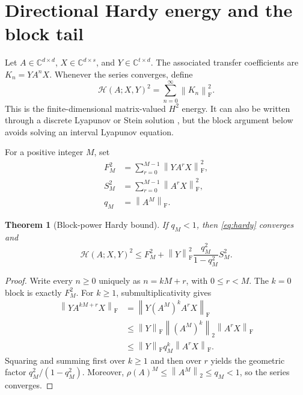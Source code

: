 \documentclass[11pt]{article}
\newtheorem{theorem}{Theorem}[section]
\theoremstyle{definition}
\newcommand{\norm}[1]{\left\lVert#1\right\rVert}
\newcommand{\F}{\mathrm F}
\newcommand{\HH}{\mathcal H}
\begin{document}
\section{Directional Hardy energy and the block tail}
\label{sec:block}

Let $A\in\mathbb C^{d\times d}$,
$X\in\mathbb C^{d\times s}$, and
$Y\in\mathbb C^{t\times d}$.  The associated transfer coefficients are
$K_n=YA^nX$.  Whenever the series converges, define
\begin{equation}
 \HH(A;X,Y)^2=\sum_{n=0}^{\infty}\norm{K_n}_{\F}^2.
 \label{eq:hardy}
\end{equation}
This is the finite-dimensional matrix-valued $H^2$ energy.  It can also be
written through a discrete Lyapunov or Stein solution
\citep{Antoulas2005,LancasterRodman1995}, but the block argument below avoids
solving an interval Lyapunov equation.

For a positive integer $M$, set
\begin{align}
 F_M^2&=\sum_{r=0}^{M-1}\norm{YA^rX}_{\F}^2,\label{eq:finite}\\
 S_M^2&=\sum_{r=0}^{M-1}\norm{A^rX}_{\F}^2,\label{eq:source}\\
 q_M&=\norm{A^M}_{\F}.\label{eq:q}
\end{align}

\begin{theorem}[Block-power Hardy bound]
\label{thm:block}
If $q_M<1$, then \eqref{eq:hardy} converges and
\begin{equation}
 \HH(A;X,Y)^2
 \le F_M^2+\norm{Y}_{\F}^2
       \frac{q_M^2}{1-q_M^2}S_M^2.
 \label{eq:block-bound}
\end{equation}
\end{theorem}

\begin{proof}
Write every $n\ge0$ uniquely as $n=kM+r$, with
$0\le r<M$.  The $k=0$ block is exactly $F_M^2$.  For $k\ge1$,
submultiplicativity gives
\begin{align*}
 \norm{YA^{kM+r}X}_{\F}
 &=\norm{Y(A^M)^kA^rX}_{\F}\\
 &\le \norm{Y}_{\F}\norm{(A^M)^k}_2\norm{A^rX}_{\F}\\
 &\le \norm{Y}_{\F}q_M^k\norm{A^rX}_{\F}.
\end{align*}
Squaring and summing first over $k\ge1$ and then over $r$ yields the
geometric factor $q_M^2/(1-q_M^2)$.  Moreover,
$\rho(A)^M\le\norm{A^M}_2\le q_M<1$, so the series converges.
\end{proof}
\end{document}

